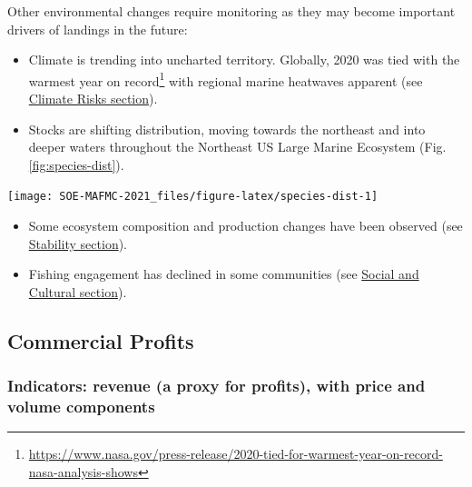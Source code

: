 \documentclass[
  10pt,
]{article}
\providecommand{\tightlist}{%
  \setlength{\itemsep}{0pt}\setlength{\parskip}{0pt}}
\let\origfigure\figure
\let\endorigfigure\endfigure
\renewenvironment{figure}[1][2] {
    \expandafter\origfigure\expandafter[H]
} {
    \endorigfigure
}
\begin{document}
Other environmental changes require monitoring as they may become
important drivers of landings in the future:

\begin{itemize}
\tightlist
\item
  Climate is trending into uncharted territory. Globally, 2020 was tied
  with the warmest year on record\footnote{\url{https://www.nasa.gov/press-release/2020-tied-for-warmest-year-on-record-nasa-analysis-shows}}
  with regional marine heatwaves apparent (see
  \protect\hyperlink{climate-and-ecosystem-productivity}{Climate Risks
  section}).\\
\item
  Stocks are shifting distribution, moving towards the northeast and
  into deeper waters throughout the Northeast US Large Marine Ecosystem
  (Fig. \ref{fig:species-dist}).
\end{itemize}

\begin{figure}

{\centering \texttt{[image: SOE-MAFMC-2021\_files/figure-latex/species-dist-1]} 

}

\caption{Aggregate species distribution metrics for species in the Northeast Large Marine Ecosystem.}\label{fig:species-dist}
\end{figure}

\begin{itemize}
\tightlist
\item
  Some ecosystem composition and production changes have been observed
  (see \protect\hyperlink{stability}{Stability section}).
\item
  Fishing engagement has declined in some communities (see
  \protect\hyperlink{social-and-cultural}{Social and Cultural section}).
\end{itemize}

\hypertarget{commercial-profits}{%
\subsection{Commercial Profits}\label{commercial-profits}}

\hypertarget{indicators-revenue-a-proxy-for-profits-with-price-and-volume-components}{%
\subsubsection{Indicators: revenue (a proxy for profits), with price and
volume
components}\label{indicators-revenue-a-proxy-for-profits-with-price-and-volume-components}}
\end{document}
